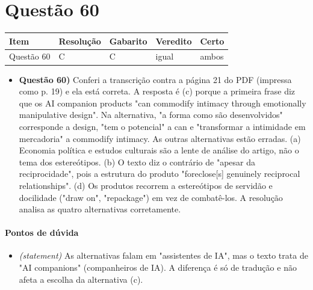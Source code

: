 \documentclass{article}%
\begin{document}
\section*{Questão 60}%
\begin{longtable}{@{}p{} p{} p{} p{} p{}@{}}\toprule Item & Resolução & Gabarito & Veredito & Certo \\ \midrule
Questão 60 & C & C & igual & ambos \\
\bottomrule\end{longtable}%
\begin{itemize}%
\item%
\textbf{Questão 60)} Conferi a transcrição contra a página 21 do PDF (impressa como p. 19) e ela está correta. A resposta é (c) porque a primeira frase diz que os AI companion products "can commodify intimacy through emotionally manipulative design". Na alternativa, "a forma como são desenvolvidos" corresponde a design, "tem o potencial" a can e "transformar a intimidade em mercadoria" a commodify intimacy. As outras alternativas estão erradas. (a) Economia política e estudos culturais são a lente de análise do artigo, não o tema dos estereótipos. (b) O texto diz o contrário de "apesar da reciprocidade", pois a estrutura do produto "foreclose{[}s{]} genuinely reciprocal relationships". (d) Os produtos recorrem a estereótipos de servidão e docilidade ("draw on", "repackage") em vez de combatê{-}los. A resolução analisa as quatro alternativas corretamente.%
\end{itemize}%
\paragraph{Pontos de dúvida}%
\begin{itemize}%
\item%
\textit{(statement)} As alternativas falam em "assistentes de IA", mas o texto trata de "AI companions" (companheiros de IA). A diferença é só de tradução e não afeta a escolha da alternativa (c).%
\end{itemize}%
\end{document}
